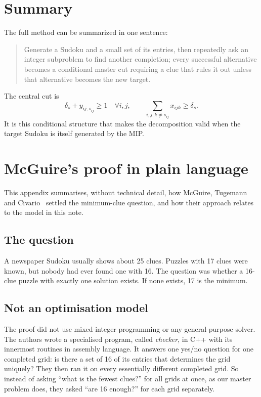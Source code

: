 \documentclass[11pt]{article}
\begin{document}
\section{Summary}

The full method can be summarized in one sentence:
\begin{quote}
Generate a Sudoku and a small set of its entries, then repeatedly ask an integer subproblem to find another completion; every successful alternative becomes a conditional master cut requiring a clue that rules it out unless that alternative becomes the new target.
\end{quote}

The central cut is
\[
\delta_s+ y_{ij,s_{ij}}\ge1\quad\forall i,j,
\qquad
\sum_{i,j,k\ne s_{ij}}x_{ijk}\ge\delta_s.
\]
It is this conditional structure that makes the decomposition valid when the target Sudoku is itself generated by the MIP.

\appendix

\section{McGuire's proof in plain language}
\label{app:mcguire}

This appendix summarises, without technical detail, how McGuire, Tugemann and Civario~\cite{mcguire} settled the minimum-clue question, and how their approach relates to the model in this note.

\subsection*{The question}

A newspaper Sudoku usually shows about 25 clues. Puzzles with 17 clues were known, but nobody had ever found one with 16. The question was whether a 16-clue puzzle with exactly one solution exists. If none exists, 17 is the minimum.

\subsection*{Not an optimisation model}

The proof did not use mixed-integer programming or any general-purpose solver. The authors wrote a specialised program, called \emph{checker}, in C++ with its innermost routines in assembly language. It answers one yes/no question for one completed grid: is there a set of 16 of its entries that determines the grid uniquely? They then ran it on every essentially different completed grid. So instead of asking ``what is the fewest clues?'' for all grids at once, as our master problem does, they asked ``are 16 enough?'' for each grid separately.
\end{document}
